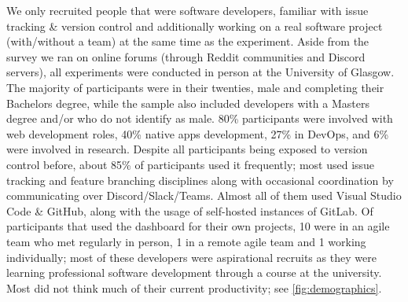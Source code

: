 \documentclass[../mpaper.tex]{subfiles}
\begin{document}
We only recruited people that were software developers, familiar with issue tracking \& version control and additionally working on a real software project (with/without a team) at the same time as the experiment. Aside from the survey we ran on online forums (through Reddit communities and Discord servers), all experiments were conducted in person at the University of Glasgow. The majority of participants were in their twenties, male and completing their Bachelors degree, while the sample also included developers with a Masters degree and/or who do not identify as male. 80\% participants were involved with web development roles, 40\% native apps development, 27\% in DevOps, and 6\% were involved in research. Despite all participants being exposed to version control before, about 85\% of participants used it frequently; most used issue tracking and feature branching disciplines along with occasional coordination by communicating over Discord/Slack/Teams. Almost all of them used Visual Studio Code \& GitHub, along with the usage of self-hosted instances of GitLab. Of participants that used the dashboard for their own projects, 10 were in an agile team who met regularly in person, 1 in a remote agile team and 1 working individually; most of these developers were aspirational recruits as they were learning professional software development through a course at the university. Most did not think much of their current productivity; see \autoref{fig:demographics}.
\end{document}
